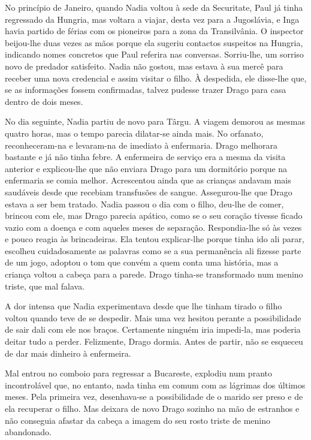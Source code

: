 No princípio de Janeiro, quando Nadia voltou à sede
da Securitate, Paul já tinha regressado da Hungria, mas voltara a
viajar, desta vez para a Jugoslávia, e Inga havia partido de férias com
os pioneiros para a zona da Transilvânia. O inspector beijou-lhe duas
vezes as mãos porque ela sugeriu contactos suspeitos na Hungria,
indicando
nomes concretos que Paul referira nas conversas. Sorriu-lhe, um sorriso novo de predador satisfeito. Nadia não gostou, mas
estava à sua mercê para receber uma nova credencial e assim visitar o
filho. À despedida, ele disse-lhe que, se as informações fossem
confirmadas, talvez pudesse trazer Drago para casa dentro de dois meses.

No dia seguinte, Nadia partiu de novo para Târgu. A viagem demorou as
mesmas quatro horas, mas o tempo parecia dilatar-se ainda mais. No
orfanato, reconheceram-na e levaram-na de imediato à enfermaria. Drago melhorara bastante e
já não tinha febre. A enfermeira de serviço era a mesma da visita
anterior e explicou-lhe que não enviara Drago para um dormitório porque
na enfermaria se comia melhor. Acrescentou ainda que as crianças andavam mais saudáveis desde que recebiam transfusões de sangue.
Assegurou-lhe que Drago estava a ser bem tratado. Nadia passou o dia com
o filho, deu-lhe de comer, brincou com ele, mas Drago parecia apático,
como se o seu coração tivesse ficado vazio com a doença e com aqueles
meses de separação. Respondia-lhe só às vezes e pouco reagia às
brincadeiras. Ela tentou explicar-lhe porque tinha ido ali parar,
escolheu cuidadosamente as palavras como se a sua permanência ali
fizesse parte de um jogo, adoptou o tom que convém a quem conta uma
história, mas a criança voltou a cabeça para a parede. Drago tinha-se
transformado num menino triste, que mal falava.

A dor intensa que Nadia experimentava desde que lhe tinham tirado o
filho voltou quando teve de se despedir. Mais uma vez hesitou perante a
possibilidade de sair dali com ele nos braços. Certamente ninguém iria
impedi-la,
mas poderia deitar tudo a perder. Felizmente, Drago dormia. Antes de
partir, não se esqueceu de dar mais dinheiro à enfermeira.

Mal entrou no comboio para regressar a Bucareste, explodiu num pranto
incontrolável que, no entanto, nada tinha em comum com as lágrimas dos
últimos meses. Pela primeira vez, desenhava-se a possibilidade de o
marido ser preso e de ela recuperar o filho. Mas deixara de novo Drago
sozinho na mão de estranhos e não conseguia afastar da cabeça a imagem
do seu rosto triste de menino abandonado.

